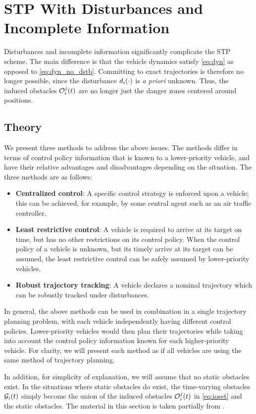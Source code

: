 \section{STP With Disturbances and Incomplete Information \label{sec:incomp}}
Disturbances and incomplete information significantly complicate the STP scheme. The main difference is that the vehicle dynamics satisfy \eqref{eq:dyn} as opposed to \eqref{eq:dyn_no_dstb}. Committing to exact trajectories is therefore no longer possible, since the disturbance $d_i(\cdot)$ is \textit{a priori} unknown. Thus, the induced obstacles $\mathcal{O}_i^j(t)$ are no longer just the danger zones centered around positions. 

\subsection{Theory}
We present three methods to address the above issues. The methods differ in terms of control policy information that is known to a lower-priority vehicle, and have their relative advantages and disadvantages depending on the situation. The three methods are as follows:
\begin{itemize}
\item \textbf{Centralized control}: A specific control strategy is enforced upon a vehicle; this can be achieved, for example, by some central agent such as an air traffic controller.
\item \textbf{Least restrictive control}: A vehicle is required to arrive at its target on time, but has no other restrictions on its control policy. When the control policy of a vehicle is unknown, but its timely arrive at its target can be assumed, the least restrictive control can be safely assumed by lower-priority vehicles.
\item \textbf{Robust trajectory tracking}: A vehicle declares a nominal trajectory which can be robustly tracked under disturbances.
\end{itemize}

In general, the above methods can be used in combination in a single trajectory planning problem, with each vehicle independently having different control policies. Lower-priority vehicles would then plan their trajectories while taking into account the control policy information known for each higher-priority vehicle. For clarity, we will present each method as if all vehicles are using the same method of trajectory planning.

In addition, for simplicity of explanation, we will assume that no static obstacles exist. In the situations where static obstacles do exist, the time-varying obstacles $\mathcal{G}_i(t)$ simply become the union of the induced obstacles $\mathcal{O}_i^j(t)$ in \eqref{eq:ioset} and the static obstacles. The material in this section is taken partially from \cite{Bansal2017}.

